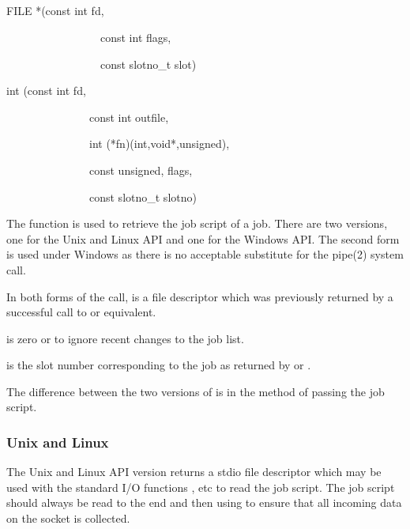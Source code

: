 \subsection{\funcnameXBjobdata{}}

\begin{expara}

FILE *\funcnameXBjobdata{}(const int fd,

\ \ \ \ \ \ \ \ \ \ \ \ \ \ \ \ \ const int flags,

\ \ \ \ \ \ \ \ \ \ \ \ \ \ \ \ \ const slotno\_t slot)

\bigskip


int \funcnameXBjobdata{}(const int fd,

\ \ \ \ \ \ \ \ \ \ \ \ \ \ \ const int outfile,

\ \ \ \ \ \ \ \ \ \ \ \ \ \ \ int (*fn)(int,void*,unsigned),

\ \ \ \ \ \ \ \ \ \ \ \ \ \ \ const unsigned, flags,

\ \ \ \ \ \ \ \ \ \ \ \ \ \ \ const slotno\_t slotno)

\end{expara}

The function \funcXBjobdata{} is used to retrieve the
job script of a job. There are two versions, one for the Unix and Linux
API and one for the Windows API. The second form is used under Windows
as there is no acceptable substitute for the pipe(2) system call.

In both forms of the call,  is a file
descriptor which was previously returned by a successful call to
\funcXBopen{} or equivalent.

 is zero or
 to ignore recent changes to
the job list.

 is the slot number corresponding to the job as returned by \funcXBjoblist{} or \funcXBjobfindslot{}.

The difference between the two versions of \funcXBjobadd{} is in the method of passing the job script.

\subsubsection{Unix and Linux}
The Unix and Linux API version returns a stdio file descriptor which may be used with the standard I/O functions ,
 etc to read the job script. The job script should always be read to the end and then using
 to ensure that all incoming data on the socket is collected.

